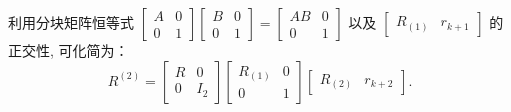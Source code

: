 利用分块矩阵恒等式 $\begin{bmatrix}A & 0\\0 & 1\end{bmatrix}\begin{bmatrix}B & 0\\0 & 1\end{bmatrix}=\begin{bmatrix}AB & 0\\0 & 1\end{bmatrix}$ 以及 $\begin{bmatrix}R_{(1)} & r_{k+1}\end{bmatrix}$ 的正交性, 可化简为：
\begin{equation}
R^{(2)} = \begin{bmatrix}R & 0\\0 & I_2\end{bmatrix} \begin{bmatrix}R_{(1)} & 0\\0 & 1\end{bmatrix} \begin{bmatrix}R_{(2)} & r_{k+2}\end{bmatrix}.
\end{equation}

